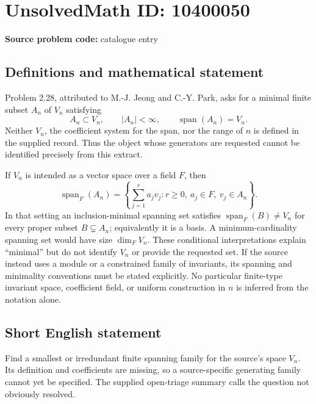 \documentclass[11pt]{article}
\begin{document}
\section*{UnsolvedMath ID: 10400050}
\textbf{Source problem code:} catalogue entry
\subsection{Definitions and mathematical statement}
Problem 2.28, attributed to M.-J. Jeong and C.-Y. Park, asks for a minimal finite subset \(A_n\) of \(V_n\) satisfying
\[
 A_n\subset V_n,\qquad |A_n|<\infty,\qquad
 \operatorname{span}(A_n)=V_n.
\]
Neither \(V_n\), the coefficient system for the span, nor the range of \(n\) is defined in the supplied record. Thus the object whose generators are requested cannot be identified precisely from this extract.

If \(V_n\) is intended as a vector space over a field \(F\), then
\[
 \operatorname{span}_F(A_n)=
 \left\{\sum_{j=1}^{r}a_jv_j:r\ge0,\ a_j\in F,\ v_j\in A_n\right\}.
\]
In that setting an inclusion-minimal spanning set satisfies \(\operatorname{span}_F(B)\ne V_n\) for every proper subset \(B\subsetneq A_n\); equivalently it is a basis. A minimum-cardinality spanning set would have size \(\dim_F V_n\). These conditional interpretations explain ``minimal'' but do not identify \(V_n\) or provide the requested set. If the source instead uses a module or a constrained family of invariants, its spanning and minimality conventions must be stated explicitly. No particular finite-type invariant space, coefficient field, or uniform construction in \(n\) is inferred from the notation alone.
\subsection{Short English statement}
Find a smallest or irredundant finite spanning family for the source's space \(V_n\). Its definition and coefficients are missing, so a source-specific generating family cannot yet be specified. The supplied open-triage summary calls the question not obviously resolved.
\end{document}
